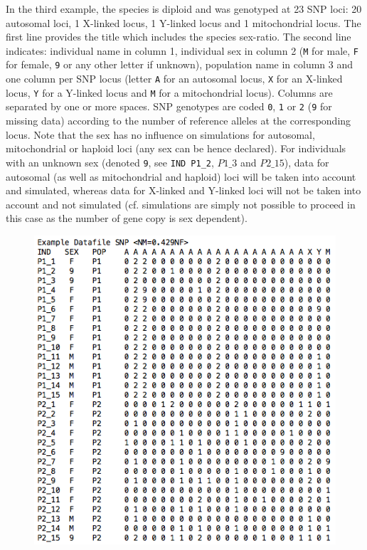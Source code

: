 In the third example, the species is diploid and was genotyped at 23 SNP loci: 20 autosomal loci, 1 
 X-linked locus, 1 Y-linked locus and 1 mitochondrial locus. The first line provides the title which includes
 the species sex-ratio. The second line indicates: individual name in column 1, individual sex in column 2 
 (\texttt{M} for male, \texttt{F} for female, \texttt{9} or any other letter if unknown), population name in 
column 3 and one column per SNP locus (letter \texttt{A} for an autosomal locus, \texttt{X} for an X-linked
locus, \texttt{Y} for a Y-linked locus and \texttt{M} for a mitochondrial locus). Columns are separated by
one or more spaces. SNP genotypes are coded \texttt{0}, \texttt{1} or \texttt{2} (\texttt{9} for missing data) according 
 to the number of reference alleles at the corresponding locus. Note that the sex has no influence on simulations
 for autosomal, mitochondrial or haploid loci (any sex can be hence declared). For individuals with an unknown sex 
 (denoted \texttt{9}, see \texttt{IND P1\_2}, $P1\_3$  and $P2\_15$), data for autosomal (as well as mitochondrial and haploid) loci will be taken into account and simulated, whereas data for X-linked and Y-linked loci will not be taken into account and not 
 simulated (cf. simulations are simply not possible to proceed in this case as the number of gene copy is sex dependent).

\begin{figure}[h]
\includegraphics[scale=0.5]{gui_pictures/screenga003.png}
\end{figure}



